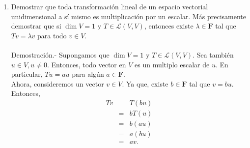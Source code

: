 \begin{enumerate}[\bfseries 1.]
    \item Demostrar que toda transformación lineal de un espacio vectorial unidimensional a sí mismo es multiplicación por un escalar. Más precisamente demostrar que si $\dim V = 1$ y $T\in\mathcal{L}(V,V)$, entonces existe $\lambda \in \textbf{F}$ tal que $Tv=\lambda v$ para todo $v\in V$.\\\\
	Demostración.-\; Supongamos que $\dim V=1$ y $T\in \mathcal{L}(V,V)$. Sea también $u\in V,u\neq 0$. Entonces, todo vector en $V$ es un multiplo escalar de $u$. En particular, $Tu=au$ para algún $a\in \textbf{F}$.\\
	Ahora, consideremos un vector $v\in V$. Ya que, existe $b\in \textbf{F}$ tal que $v=bu$. Entonces,
	$$
	\begin{array}{rcl}
	    Tv&=&T(bu)\\
	      &=& bT(u)\\
	      &=&b(au)\\
	      &=&a(bu)\\
	      &=&av.
	\end{array}
	$$
	\vspace{.5cm}


\end{enumerate}
